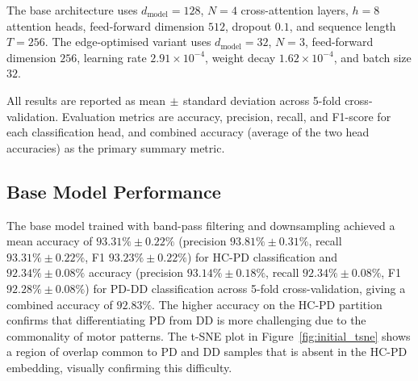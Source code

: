 \documentclass[pmlr]{jmlr}
\begin{document}
The base architecture uses $d_{\text{model}}{=}128$, $N{=}4$
cross-attention layers, $h{=}8$ attention heads, feed-forward
dimension $512$, dropout $0.1$, and sequence length $T{=}256$. The
edge-optimised variant uses $d_{\text{model}}{=}32$, $N{=}3$,
feed-forward dimension $256$, learning rate $2.91{\times}10^{-4}$,
weight decay $1.62{\times}10^{-4}$, and batch size $32$.

All results are reported as mean$\,\pm\,$standard deviation across
5-fold cross-validation. Evaluation metrics are accuracy, precision,
recall, and F1-score for each classification head, and combined
accuracy (average of the two head accuracies) as the primary
summary metric.

\subsection{Base Model Performance}

The base model trained with band-pass filtering and downsampling
achieved a mean accuracy of $93.31\%\pm0.22\%$ (precision
$93.81\%\pm0.31\%$, recall $93.31\%\pm0.22\%$, F1
$93.23\%\pm0.22\%$) for HC-PD classification and $92.34\%\pm0.08\%$
accuracy (precision $93.14\%\pm0.18\%$, recall $92.34\%\pm0.08\%$,
F1 $92.28\%\pm0.08\%$) for PD-DD classification across 5-fold
cross-validation, giving a combined accuracy of $92.83\%$. The higher
accuracy on the HC-PD partition confirms that differentiating PD from
DD is more challenging due to the commonality of motor patterns.
The t-SNE plot in Figure~\ref{fig:initial_tsne} shows a region of
overlap common to PD and DD samples that is absent in the HC-PD
embedding, visually confirming this difficulty.

\end{document}
